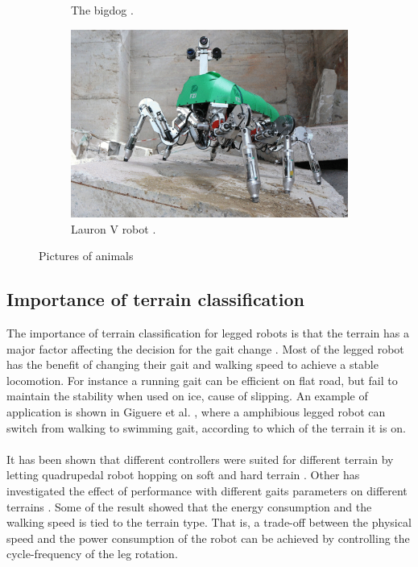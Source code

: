 \documentclass[USenglish]{ifimaster}  %
\begin{document}
\begin{figure}
\begin{subfigure}[b]{0.22\textwidth}
			\caption{The bigdog \cite{Raibert200810822}.}
			\label{fig:bigDog}
		\end{subfigure}\hfill
		\begin{subfigure}[b]{0.22\textwidth}
			\centering
			\includegraphics[width=\linewidth]{Figures/Lauron}
			\caption{Lauron V robot \cite{6878051}.}
			\label{fig:LAURON}
		\end{subfigure}
		\caption{Pictures of animals}\label{fig:robots}
	\end{figure}
	
	\FloatBarrier
	
	\subsection{Importance of terrain classification}
	The importance of terrain classification for legged robots is that the terrain has a major factor affecting the decision for the gait change \cite{6569179}. Most of the legged robot has the benefit of changing their gait and walking speed to achieve a stable locomotion. For instance a running gait can be efficient on flat road, but fail to maintain the stability when used on ice, cause of slipping. An example of application is shown in Giguere et al. \cite{Giguere06environmentidentification}, where a amphibious legged robot can switch from walking to swimming gait, according to which of the terrain it is on. 
	\\
	\\
	It has been shown that different controllers were suited for different terrain by letting quadrupedal robot hopping on soft and hard terrain \cite{7487541}. Other has investigated the effect of performance with different gaits parameters on different terrains \cite{6569179}. Some of the result showed that the energy consumption and the walking speed is tied to the terrain type. That is, a trade-off between the physical speed and the power consumption of the robot can be achieved by controlling the cycle-frequency of the leg rotation.
	
\end{document}
